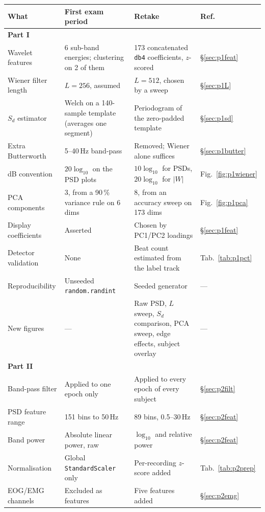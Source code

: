 \documentclass[11pt,a4paper]{article}
\newcommand{\hertz}{Hz}
\newcommand{\percent}{\%}
\newcommand{\SI}[2]{#1\,#2}
\newcommand{\SIrange}[3]{#1--#2\,#3}
\begin{document}
\begin{longtable}{p{4.0cm}p{4.9cm}p{4.5cm}l}
\toprule
\textbf{What} & \textbf{First exam period} & \textbf{Retake} & \textbf{Ref.} \\
\midrule
\endhead
\multicolumn{4}{l}{\textbf{Part I}}\\
\midrule
Wavelet features & 6 sub-band energies; clustering on 2 of them & 173 concatenated \texttt{db4} coefficients, $z$-scored & \S\ref{sec:p1feat} \\
Wiener filter length & $L=256$, assumed & $L=512$, chosen by a sweep & \S\ref{sec:p1L} \\
$S_d$ estimator & Welch on a 140-sample template (averages one segment) & Periodogram of the zero-padded template & \S\ref{sec:p1sd} \\
Extra Butterworth & \SIrange{5}{40}{\hertz} band-pass & Removed; Wiener alone suffices & \S\ref{sec:p1butter} \\
dB convention & $20\log_{10}$ on the PSD plots & $10\log_{10}$ for PSDs, $20\log_{10}$ for $|W|$ & Fig.~\ref{fig:p1wiener} \\
PCA components & 3, from a \SI{90}{\percent} variance rule on 6 dims & 8, from an accuracy sweep on 173 dims & Fig.~\ref{fig:p1pca} \\
Display coefficients & Asserted & Chosen by PC1/PC2 loadings & \S\ref{sec:p1feat} \\
Detector validation & None & Beat count estimated from the label track & Tab.~\ref{tab:p1pct} \\
Reproducibility & Unseeded \texttt{random.randint} & Seeded generator & --- \\
New figures & --- & Raw PSD, $L$ sweep, $S_d$ comparison, PCA sweep, edge effects, subject overlay & --- \\
\midrule
\multicolumn{4}{l}{\textbf{Part II}}\\
\midrule
Band-pass filter & Applied to one epoch only & Applied to every epoch of every subject & \S\ref{sec:p2filt} \\
PSD feature range & 151 bins to \SI{50}{\hertz} & 89 bins, \SIrange{0.5}{30}{\hertz} & \S\ref{sec:p2feat} \\
Band power & Absolute linear power, raw & $\log_{10}$ and relative power & \S\ref{sec:p2feat} \\
Normalisation & Global \texttt{StandardScaler} only & Per-recording $z$-score added & Tab.~\ref{tab:p2prep} \\
EOG/EMG channels & Excluded as features & Five features added & \S\ref{sec:p2emg} \\

\end{longtable}
\end{document}
